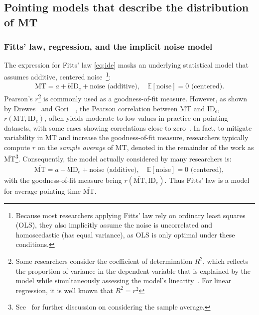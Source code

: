 \documentclass[acmlarge, manuscript,review]{acmart}
\newcommand{\mmt}{\ensuremath{\overline{\mt}}\xspace}
\newcommand{\mt}{\ensuremath{{\text{MT}}}\xspace}
\newcommand{\ide}{\ensuremath{{\text{ID}_e}}\xspace}
\begin{document}
\subsection{Pointing models that describe the distribution of MT}
\subsubsection{Fitts' law, regression, and the implicit noise model \label{subs:rw::fitts}}
The expression for Fitts' law \autoref{eq:ide} masks an underlying statistical model that assumes additive, centered noise~\cite{soukoreff2004}\footnote{Because most researchers applying Fitts' law rely on ordinary least squares (OLS), they also implicitly assume the noise is uncorrelated and homoscedastic (has equal variance), as OLS is only optimal under these conditions.}:
\begin{align} \mt = a + b\ide + \text{noise (additive)}, \quad \mathbb{E}[\text{noise}] = 0 \text{ (centered)}. \label{eq:mt}
\end{align}
Pearson's $r$\footnote{Some researchers consider the coefficient of determination $R^2$, which reflects the proportion of variance in the dependent variable that is explained by the model while simultaneously assessing the model’s linearity~\cite{lee1988}. For linear regression, it is well known that $R^2 = r^2$} is commonly used as a goodness-of-fit measure. %
However, as shown by Drewes~\cite{drewes2013} and Gori~\etal~\cite{gori2018chi}, the Pearson correlation between MT and \ide, $r(\mt, \ide)$, often yields moderate to low values in practice on pointing datasets, with some cases showing correlations close to zero~\cite{gori2018tochi}.
In fact, to mitigate variability in MT and increase the goodness-of-fit measure, researchers typically compute $r$ on the \textit{sample average} of MT, denoted in the remainder of the work as \mmt\footnote{See~\cite{gori2017two} for further discussion on considering the sample average.}. Consequently, the model actually considered by many researchers is:
\begin{align}
  \mmt = a + b\ide + \text{noise (additive)}, \quad \mathbb{E}[\text{noise}] = 0 \text{ (centered)}, \label{eq:mmt}
\end{align}
with the goodness-of-fit measure being $r(\mmt, \ide)$. Thus Fitts' law is a model for average pointing time \mmt.
\end{document}
